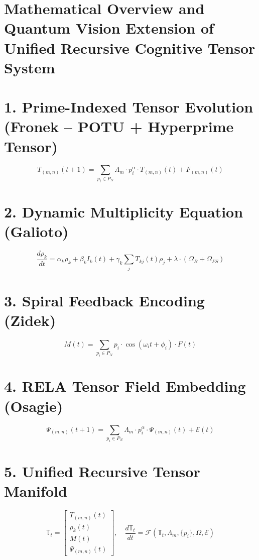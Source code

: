 \documentclass{article}
\theoremstyle{plain}
\begin{document}

\section{Mathematical Overview and Quantum Vision Extension of Unified Recursive Cognitive Tensor System}

\section*{1. Prime-Indexed Tensor Evolution (Fronek – POTU + Hyperprime Tensor)}
\begin{equation}
T_{(m,n)}(t+1) = \sum_{p_i \in P_N} \Lambda_m \cdot p_i^\alpha \cdot T_{(m,n)}(t) + F_{(m,n)}(t)
\end{equation}

\section*{2. Dynamic Multiplicity Equation (Galioto)}
\begin{equation}
\frac{d\rho_k}{dt} = \alpha_k \rho_k + \beta_k I_k(t) + \gamma_k \sum_j T_{kj}(t) \rho_j + \lambda \cdot (\Omega_B + \Omega_{FS})
\end{equation}

\section*{3. Spiral Feedback Encoding (Zidek)}
\begin{equation}
M(t) = \sum_{p_i \in P_N} p_i \cdot \cos(\omega_i t + \phi_i) \cdot F(t)
\end{equation}

\section*{4. RELA Tensor Field Embedding (Osagie)}
\begin{equation}
\Psi_{(m,n)}(t+1) = \sum_{p_i \in P_N} \Lambda_m \cdot p_i^\alpha \cdot \Psi_{(m,n)}(t) + \mathcal{E}(t)
\end{equation}

\section*{5. Unified Recursive Tensor Manifold}
\begin{equation}
\mathbb{T}_t = \begin{bmatrix}
T_{(m,n)}(t) \\
\rho_k(t) \\
M(t) \\
\Psi_{(m,n)}(t)
\end{bmatrix}, \quad
\frac{d\mathbb{T}_t}{dt} = \mathcal{F}(\mathbb{T}_t, \Lambda_m, \{p_i\}, \Omega, \mathcal{E})
\end{equation}
\end{document}
